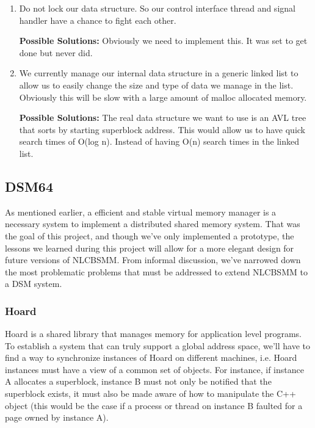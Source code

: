\documentclass[9pt]{sig-alternate-10pt}
\begin{document}
\begin{enumerate}
{\bf Possible Solutions:} A possible solution in this case is to build off the previous solution for our mmap allocated data structure areas.  We could add another subclass of the Memory class which refers to the large malloc allocated locations.
\item Do not lock our data structure. So our control interface thread and signal handler have a chance to fight each other.

{\bf Possible Solutions:} Obviously we need to implement this. It was set to get done but never did. 

\item We currently manage our internal data structure in a generic linked list to allow us to easily change the size and type of data we manage in the list. Obviously this will be slow with a large amount of malloc allocated memory.

{\bf Possible Solutions:} The real data structure we want to use is an AVL tree that sorts by starting superblock address. This would allow us to have quick search times of O(log n). Instead of having O(n) search times in the linked list.
\end{enumerate}

\subsection{DSM64}
As mentioned earlier, a efficient and stable virtual memory manager is a necessary system to implement a distributed shared memory system.  That was the goal of this project, and though we've only implemented a prototype, the lessons we learned during this project will allow for a more elegant design for future versions of NLCBSMM.  From informal discussion, we've narrowed down the most problematic problems that must be addressed to extend NLCBSMM to a DSM system.

\subsubsection{Hoard}
Hoard is a shared library that manages memory for application level programs.  To establish a system that can truly support a global address space, we'll have to find a way to synchronize instances of Hoard on different machines, i.e. Hoard instances must have a view of a common set of objects.  For instance, if instance A allocates a superblock, instance B must not only be notified that the superblock exists, it must also be made aware of how to manipulate the C++ object (this would be the case if a process or thread on instance B faulted for a page owned by instance A).  
\end{document}

